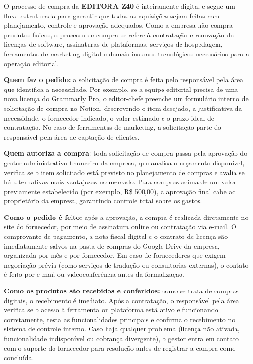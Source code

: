 \documentclass[10pt,a4paper]{article}
\begin{document}
O processo de compra da \textbf{EDITORA Z40} é inteiramente digital e segue um fluxo estruturado para garantir que todas as aquisições sejam feitas com planejamento, controle e aprovação adequados. Como a empresa não compra produtos físicos, o processo de compra se refere à contratação e renovação de licenças de software, assinaturas de plataformas, serviços de hospedagem, ferramentas de marketing digital e demais insumos tecnológicos necessários para a operação editorial.

\textbf{Quem faz o pedido:} a solicitação de compra é feita pelo responsável pela área que identifica a necessidade. Por exemplo, se a equipe editorial precisa de uma nova licença do Grammarly Pro, o editor-chefe preenche um formulário interno de solicitação de compra no Notion, descrevendo o item desejado, a justificativa da necessidade, o fornecedor indicado, o valor estimado e o prazo ideal de contratação. No caso de ferramentas de marketing, a solicitação parte do responsável pela área de captação de clientes.

\textbf{Quem autoriza a compra:} toda solicitação de compra passa pela aprovação do gestor administrativo-financeiro da empresa, que analisa o orçamento disponível, verifica se o item solicitado está previsto no planejamento de compras e avalia se há alternativas mais vantajosas no mercado. Para compras acima de um valor previamente estabelecido (por exemplo, R\$ 500,00), a aprovação final cabe ao proprietário da empresa, garantindo controle total sobre os gastos.

\textbf{Como o pedido é feito:} após a aprovação, a compra é realizada diretamente no site do fornecedor, por meio de assinatura online ou contratação via e-mail. O comprovante de pagamento, a nota fiscal digital e o contrato de licença são imediatamente salvos na pasta de compras do Google Drive da empresa, organizada por mês e por fornecedor. Em caso de fornecedores que exigem negociação prévia (como serviços de tradução ou consultorias externas), o contato é feito por e-mail ou videoconferência antes da formalização.

\textbf{Como os produtos são recebidos e conferidos:} como se trata de compras digitais, o recebimento é imediato. Após a contratação, o responsável pela área verifica se o acesso à ferramenta ou plataforma está ativo e funcionando corretamente, testa as funcionalidades principais e confirma o recebimento no sistema de controle interno. Caso haja qualquer problema (licença não ativada, funcionalidade indisponível ou cobrança divergente), o gestor entra em contato com o suporte do fornecedor para resolução antes de registrar a compra como concluída.
\end{document}
